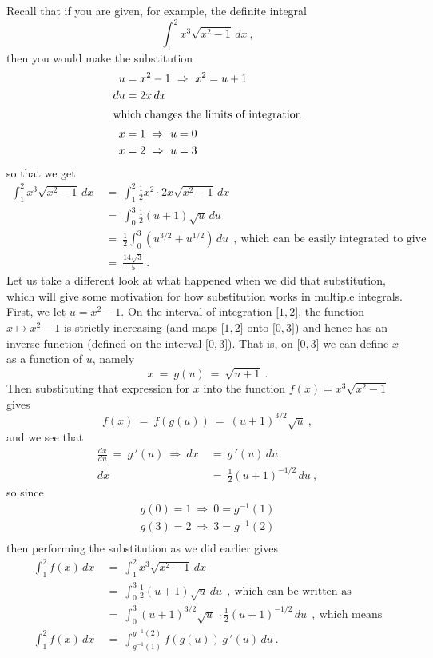 Recall that if you are given, for example, the definite integral
\begin{displaymath}
 \int_1^2 x^3 \sqrt{x^2 - 1}\,dx ~,
\end{displaymath}
then you would make the substitution
\begin{align*}
u &= x^2 - 1 ~\Rightarrow~ x^2 = u + 1\\
du &= 2x\,dx\\
\intertext{which changes the limits of integration}
x &= 1 ~\Rightarrow~ u = 0\\
x &= 2 ~\Rightarrow~ u = 3
\end{align*}
so that we get
\begin{align*}
 \int_1^2 x^3 \sqrt{x^2 - 1}\,dx ~&=~ \int_1^2 \tfrac{1}{2}x^2 \cdot 2x \sqrt{x^2 - 1}\,dx\\
 &=~ \int_0^3 \tfrac{1}{2}(u+1)\sqrt{u}\,du\\
 &=~ \tfrac{1}{2} \int_0^3 \left( u^{3/2} + u^{1/2} \right)\,du ~~,~\text{which can be easily integrated to give}\\
 &=~ \tfrac{14\sqrt{3}}{5} ~.
\end{align*}
Let us take a different look at what happened when we did that substitution, which will give some motivation for how
substitution works in multiple integrals. First, we let $u = x^2 - 1$. On the interval of integration
$\lbrack 1,2 \rbrack$, the function $x \mapsto x^2 - 1$ is strictly increasing (and maps $\lbrack 1,2 \rbrack$ onto
$\lbrack 0,3 \rbrack$) and hence has an inverse function (defined on the interval $\lbrack 0,3 \rbrack$). That
is, on $\lbrack 0,3 \rbrack$ we can define $x$ as a function of $u$, namely
\begin{displaymath}
 x ~=~ g(u) ~=~ \sqrt{u+1} ~.
\end{displaymath}
Then substituting that expression for $x$ into the function $f(x) = x^3 \sqrt{x^2 - 1}$ gives
\begin{displaymath}
 f(x) ~=~ f(g(u)) ~=~ (u+1)^{3/2} \sqrt{u} ~,
\end{displaymath}
and we see that
\begin{align*}
 \frac{dx}{du} ~=~ g\,'(u) ~\Rightarrow~ dx ~&=~ g\,'(u)\,du\\
 dx ~&=~ \tfrac{1}{2} (u+1)^{-1/2}\,du ~,
\end{align*}
so since
\begin{align*}
 g(0) = 1 ~\Rightarrow~ 0 = g^{-1} (1)\\
 g(3) = 2 ~\Rightarrow~ 3 = g^{-1} (2)\\
\end{align*}
then performing the substitution as we did earlier gives
\begin{align*}
 \int_1^2 f(x)\,dx ~&=~ \int_1^2 x^3 \sqrt{x^2 - 1}\,dx\\
 &=~ \int_0^3 \tfrac{1}{2}(u+1)\sqrt{u}\,du ~~,~\text{which can be written as}\\
 &=~ \int_0^3 (u+1)^{3/2} \sqrt{u} \, \cdot \tfrac{1}{2} (u+1)^{-1/2}\,du ~~,~\text{which means}\\
 \int_1^2 f(x)\,dx ~&=~ \int_{g^{-1}(1)}^{g^{-1}(2)} f(g(u))\,g\,'(u)\,du ~.
\end{align*}

